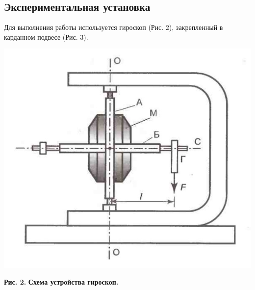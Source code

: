     
    
\subsection{Экспериментальная установка}
    
    Для выполнения работы используется гироскоп (Рис. 2), закрепленный в карданном подвесе (Рис. 3).


\begin{center}
\includegraphics[scale = 0.15]{giroskop.jpeg}
\end{center}
\begin{flushright}
{\scriptsize \textbf{Рис. 2.} \textbf {Схема устройства гироскоп.}}
\end{flushright}

